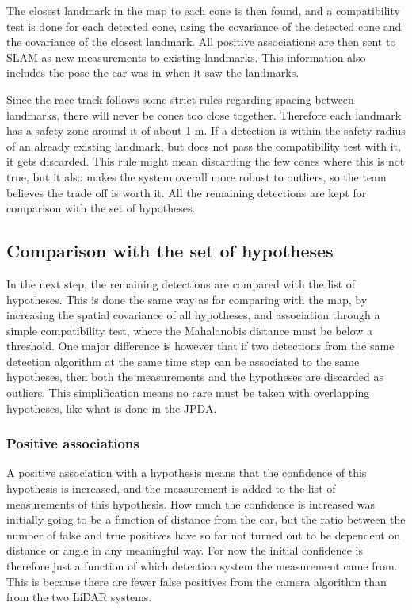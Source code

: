 The closest landmark in the map to each cone is then found, and a compatibility test is done for each detected cone, using the covariance of the detected cone and the covariance of the closest landmark. All positive associations are then sent to SLAM as new measurements to existing landmarks. This information also includes the pose the car was in when it saw the landmarks. 

Since the race track follows some strict rules regarding spacing between landmarks, there will never be  cones too close together. Therefore each landmark has a safety zone around it of about 1 \si{\metre}. If a detection is within the safety radius of an already existing landmark, but does not pass the compatibility test with it, it gets discarded. This rule might mean discarding the few cones where this is not true, but it also makes the system overall more robust to outliers, so the team believes the trade off is worth it.  All the remaining detections are kept for comparison with the set of hypotheses. 

\subsection{Comparison with the set of hypotheses}

In the next step, the remaining detections are compared with the list of hypotheses. This is done the same way as for comparing with the map, by increasing the spatial covariance of all hypotheses, and association through a simple compatibility test, where the Mahalanobis distance must be below a threshold. One major difference is however that if two detections from the same detection algorithm at the same time step can be associated to the same hypotheses, then both the measurements and the hypotheses are discarded as outliers. This simplification means no care must be taken with overlapping hypotheses, like what is done in the \gls{JPDA}. 

\subsubsection{Positive associations}

A positive association with a hypothesis means that the confidence of this hypothesis is increased, and the measurement is added to the list of measurements of this hypothesis. How much the confidence is increased was initially going to be a function of distance from the car, but the ratio between the number of false and true positives have so far not turned out to be dependent on distance or angle in any meaningful way. For now the initial confidence is therefore just a function of which detection system the measurement came from. This is because there are fewer false positives from the camera algorithm than from the two \gls{LiDAR} systems. 

